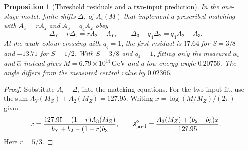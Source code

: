 \documentclass[aps,pra,onecolumn,superscriptaddress,nofootinbib,10pt]{revtex4-2}
\newtheorem{proposition}[theorem]{Proposition}
\theoremstyle{definition}
\theoremstyle{remark}
\begin{document}
\begin{proposition}[Threshold residuals and a two-input prediction]\label{cr:thresholds}
In the one-stage model, finite shifts $\Delta_i$ of $A_i(M)$
that implement a prescribed matching with $A_Y=rA_2$ and
$A_3=q_4A_2$ obey
\[
 \Delta_Y-r\Delta_2=rA_2-A_Y,\qquad
 \Delta_3-q_4\Delta_2=q_4A_2-A_3 .
\]
At the weak--colour crossing with $q_4=1$, the first residual
is $17.64$ for $S=3/8$ and $-13.71$ for $S=1/2$.
With $S=3/8$ and $q_4=1$, fitting only the measured
$\alpha_s$ and $\hat\alpha$ instead gives
$M=6.79\times10^{14}\,\mathrm{GeV}$ and a low-energy angle
$0.20756$. The angle differs from the measured central value
by $0.02366$.
\end{proposition}
\begin{proof}
Substitute $A_i+\Delta_i$ into the matching equations. For the
two-input fit, use the sum $A_Y(M_Z)+A_2(M_Z)=127.95$.
Writing $x=\log(M/M_Z)/(2\pi)$ gives
\[
 x=\frac{127.95-(1+r)A_3(M_Z)}
          {b_Y+b_2-(1+r)b_3},\qquad
 \hat s_{\rm pred}^2=\frac{A_3(M_Z)+(b_2-b_3)x}{127.95}.
\]
Here $r=5/3$.
\end{proof}
\end{document}
